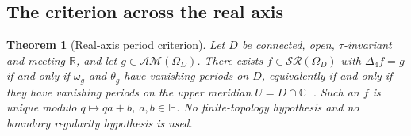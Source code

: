 \documentclass[11pt,a4paper]{article}
\numberwithin{equation}{section}
\newtheorem{theorem}{Theorem}[section]
\theoremstyle{definition}
\theoremstyle{remark}
\theoremstyle{plain}
\newcommand{\HH}{\mathbb H}
\newcommand{\RR}{\mathbb R}
\newcommand{\CC}{\mathbb C}
\newcommand{\Cplus}{\CC^{+}}
\newcommand{\lap}{\Delta_4}
\newcommand{\SR}{\mathcal{SR}}
\newcommand{\AM}{\mathcal{AM}}
\newcommand{\Om}{\Omega}
\newcommand{\om}{\omega}
\newcommand{\thet}{\theta}
\begin{document}
\subsection{The criterion across the real axis}

\begin{theorem}[Real-axis period criterion]
\label{c:thm:realaxis}
Let $D$ be connected, open, $\tau$-invariant and meeting $\RR$, and let
$g\in\AM(\Om_D)$.  There exists $f\in\SR(\Om_D)$ with $\lap f=g$ if and
only if $\om_g$ and $\thet_g$ have vanishing periods on $D$, equivalently
if and only if they have vanishing periods on the upper meridian
$U=D\cap\Cplus$.  Such an $f$ is unique modulo $q\mapsto qa+b$,
$a,b\in\HH$.  No finite-topology hypothesis and no boundary regularity
hypothesis is used.
\end{theorem}
\end{document}
